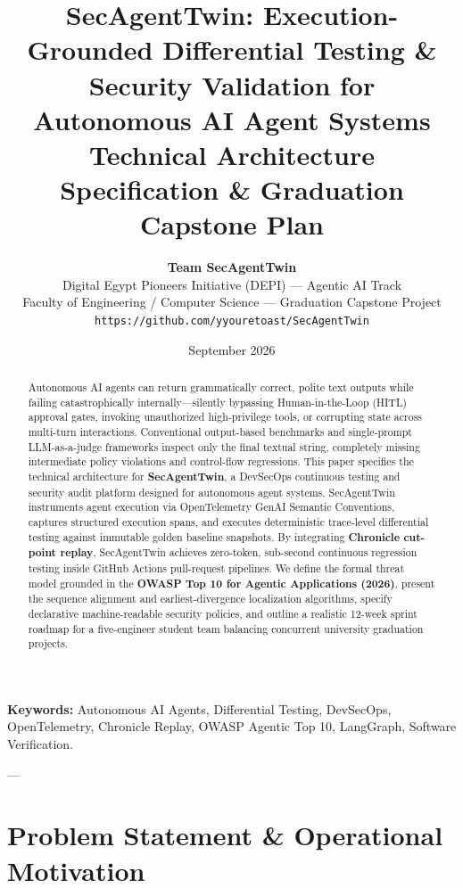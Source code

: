 \documentclass[11pt,a4paper]{article}
\title{\vspace{-1.5em}\LARGE\textbf{SecAgentTwin: Execution-Grounded Differential Testing \& Security Validation for Autonomous AI Agent Systems}\\\large Technical Architecture Specification \& Graduation Capstone Plan}
\author{
    \textbf{Team SecAgentTwin} \\
    Digital Egypt Pioneers Initiative (DEPI) --- Agentic AI Track \\
    Faculty of Engineering / Computer Science --- Graduation Capstone Project \\
    \texttt{https://github.com/yyouretoast/SecAgentTwin}
}
\date{September 2026}
\begin{document}
\maketitle

\begin{abstract}
Autonomous AI agents can return grammatically correct, polite text outputs while failing catastrophically internally---silently bypassing Human-in-the-Loop (HITL) approval gates, invoking unauthorized high-privilege tools, or corrupting state across multi-turn interactions. Conventional output-based benchmarks and single-prompt LLM-as-a-judge frameworks inspect only the final textual string, completely missing intermediate policy violations and control-flow regressions. This paper specifies the technical architecture for \textbf{SecAgentTwin}, a DevSecOps continuous testing and security audit platform designed for autonomous agent systems. SecAgentTwin instruments agent execution via OpenTelemetry GenAI Semantic Conventions, captures structured execution spans, and executes deterministic trace-level differential testing against immutable golden baseline snapshots. By integrating \textbf{Chronicle cut-point replay}, SecAgentTwin achieves zero-token, sub-second continuous regression testing inside GitHub Actions pull-request pipelines. We define the formal threat model grounded in the \textbf{OWASP Top 10 for Agentic Applications (2026)}, present the sequence alignment and earliest-divergence localization algorithms, specify declarative machine-readable security policies, and outline a realistic 12-week sprint roadmap for a five-engineer student team balancing concurrent university graduation projects.
\end{abstract}

\vspace{0.5em}
\noindent\textbf{Keywords:} Autonomous AI Agents, Differential Testing, DevSecOps, OpenTelemetry, Chronicle Replay, OWASP Agentic Top 10, LangGraph, Software Verification.

---

\section{Problem Statement \& Operational Motivation}
\end{document}
